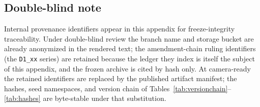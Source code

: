 \subsection{Double-blind note}
\label{app:prereg-blind}

Internal provenance identifiers appear in this appendix
for freeze-integrity traceability. Under double-blind review the branch
name and storage bucket are already anonymized in the rendered text; the
amendment-chain ruling identifiers (the \texttt{D1\_xx} series) are retained
because the ledger they index is itself the subject of this appendix, and
the frozen archive is cited by hash only. At camera-ready the retained
identifiers are replaced by the published artifact manifest; the hashes,
seed namespaces, and version chain of
Tables~\ref{tab:versionchain}--\ref{tab:hashes} are byte-stable under that
substitution.
\endgroup
\endinput
